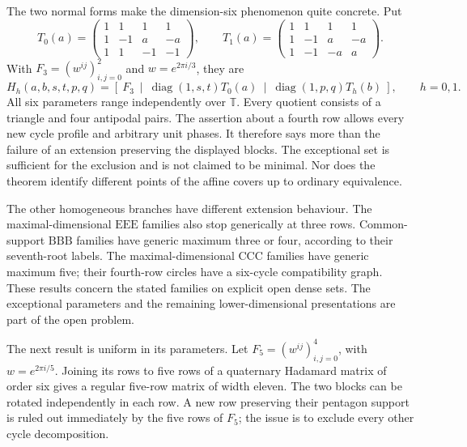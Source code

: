 \documentclass[11pt,a4paper]{article}
\theoremstyle{plain}
\theoremstyle{definition}
\theoremstyle{plain}
\begin{document}
The two normal forms make the dimension-six phenomenon quite concrete. Put
\[
T_0(a)=\begin{pmatrix}1&1&1&1\\1&-1&a&-a\\1&1&-1&-1\end{pmatrix},
\qquad
T_1(a)=\begin{pmatrix}1&1&1&1\\1&-1&a&-a\\1&-1&-a&a\end{pmatrix}.
\]
With $F_3=(w^{ij})_{i,j=0}^2$ and $w=e^{2\pi i/3}$, they are
\[
H_h(a,b,s,t,p,q)=
\left[\ F_3\ \middle|\ \operatorname{diag}(1,s,t)T_0(a)
\ \middle|\ \operatorname{diag}(1,p,q)T_h(b)\ \right],\qquad h=0,1.
\]
All six parameters range independently over $\mathbb T$. Every quotient consists of a triangle and four antipodal pairs. The assertion about a fourth row allows every new cycle profile and arbitrary unit phases. It therefore says more than the failure of an extension preserving the displayed blocks. The exceptional set is sufficient for the exclusion and is not claimed to be minimal. Nor does the theorem identify different points of the affine covers up to ordinary equivalence.

The other homogeneous branches have different extension behaviour. The maximal-dimensional $\mathrm{EEE}$ families also stop generically at three rows. Common-support $\mathrm{BBB}$ families have generic maximum three or four, according to their seventh-root labels. The maximal-dimensional $\mathrm{CCC}$ families have generic maximum five; their fourth-row circles have a six-cycle compatibility graph. These results concern the stated families on explicit open dense sets. The exceptional parameters and the remaining lower-dimensional presentations are part of the open problem.

The next result is uniform in its parameters. Let $F_5=(w^{ij})_{i,j=0}^4$, with $w=e^{2\pi i/5}$. Joining its rows to five rows of a quaternary Hadamard matrix of order six gives a regular five-row matrix of width eleven. The two blocks can be rotated independently in each row. A new row preserving their pentagon support is ruled out immediately by the five rows of $F_5$; the issue is to exclude every other cycle decomposition.
\end{document}
